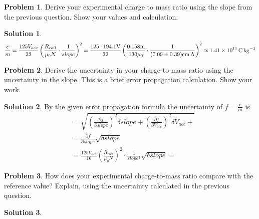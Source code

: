 \documentclass[10pt]{article}
\theoremstyle{definition}
\newtheorem{problem}{Problem}
\newtheorem{soln}{Solution}
\begin{document}
\begin{problem}
Derive your experimental charge to mass ratio using the slope from the previous question. Show your values and calculation.
\end{problem}
\begin{soln}
  $$\frac{e}{m}=\frac{125V_{acc}}{32}\left(\frac{R_{coil}}{\mu_0N}\cdot\frac{1}{slope}\right)^2=\frac{125\cdot194.1\unit{\volt}}{32}\left(\frac{0.158\unit{\meter}}{130\mu_0}\cdot\frac{1}{(7.09\pm0.39)\unit{\centi\meter\ampere}}\right)^2\approx\qty{1.41d11}{\coulomb\per\kilo\gram}$$
\end{soln}

\begin{problem}
Derive the uncertainty in your charge-to-mass ratio using the uncertainty in the slope. This is a brief error propagation calculation. Show your work.
\end{problem}
\begin{soln}
By the given error propagation formula the uncertainty of $f=\frac{e}{m}$ is
\begin{align*}
  & =\sqrt{\left(\frac{\partial f}{\partial slope}\right)^2\delta slope+\left(\frac{\partial f}{\partial V_{acc}}\right)^2\delta V_{acc}+}\\
  & =\frac{\partial f}{\partial slope}\sqrt{\delta slope}\\
  & =\frac{125V_{acc}}{16}\left(\frac{R_{coil}}{\mu_0N}\right)^2\cdot\frac{1}{slope^3}\sqrt{\delta slope}=
\end{align*}
\end{soln}

\begin{problem}
How does your experimental charge-to-mass ratio compare with the reference value? Explain, using the uncertainty calculated in the previous question.
\end{problem}
\begin{soln}
 
\end{soln}
\end{document}
